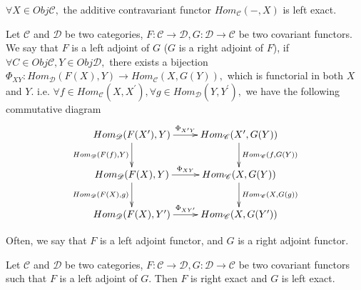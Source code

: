 \begin{remark}
$\forall X\in Obj\mathscr{C},$ the additive contravariant functor
$Hom_{\mathscr{C}}(-,X)$ is left exact.
\end{remark}
\begin{Def}
Let $\mathscr{C}$ and $\mathscr{D}$ be two categories,
$F:\mathscr{C}\rightarrow \mathscr{D}, G:\mathscr{D}\rightarrow
\mathscr{C}$ be two covariant functors. We say that $F$ is a left
adjoint of $G$ ($G$ is a right adjoint of $F$), if $\forall C\in
Obj\mathscr{C}, Y\in Obj\mathscr{D},$ there exists a bijection
$\Phi_{XY}: Hom_{\mathscr{D}}(F(X),Y)\rightarrow
Hom_{\mathscr{C}}(X,G(Y)),$ which is functorial in both $X$ and $Y.$
i.e. $\forall f\in Hom_{\mathscr{C}}(X,X^{\prime}), \forall g\in
Hom_{\mathscr{D}}(Y,Y^{\prime}),$ we have the following commutative
diagram
\[ \xymatrix{
   Hom_{\mathscr{D}}(F(X^{\prime}),Y) \ar[r]^-{\Phi_{X^{\prime}Y}}
   \ar[d]_{Hom_{\mathscr{D}}(F(f),Y)} &
   Hom_{\mathscr{C}}(X^{\prime},G(Y)) \ar[d]^{Hom_{\mathscr{C}}(f,G(Y))}\\
   Hom_{\mathscr{D}}(F(X),Y) \ar[r]^-{\Phi_{XY}}
   \ar[d]_{Hom_{\mathscr{D}}(F(X),g)} & Hom_{\mathscr{C}}(X,G(Y))
   \ar[d]^{Hom_{\mathscr{C}}(X,G(g))}                           \\
   Hom_{\mathscr{D}}(F(X),Y^{\prime}) \ar[r]^-{\Phi_{XY^{\prime}}} &
   Hom_{\mathscr{C}}(X,G(Y^{\prime})) }  \]
\end{Def}
\begin{remark}
Often, we say that $F$ is a left adjoint functor, and $G$ is a right
adjoint functor.
\end{remark}
\begin{prop}
Let $\mathscr{C}$ and $\mathscr{D}$ be two categories,
$F:\mathscr{C}\rightarrow \mathscr{D}, G:\mathscr{D}\rightarrow
\mathscr{C}$ be two covariant functors such that $F$ is a left
adjoint of $G.$ Then $F$ is right exact and $G$ is left exact.
\end{prop}
